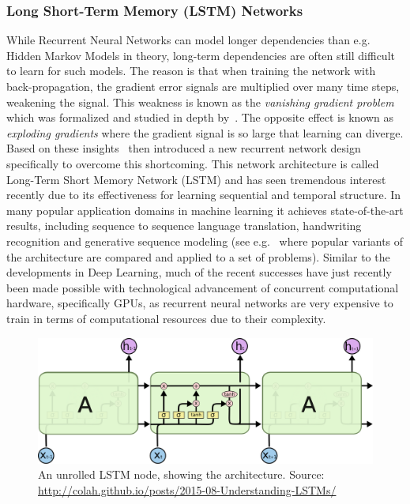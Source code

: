\subsubsection*{Long Short-Term Memory (LSTM) Networks}
\label{subs:Long Short-Term Memory (LSTM) Networks}


While Recurrent Neural Networks can model longer dependencies than e.g. Hidden Markov Models in theory, long-term dependencies are often still difficult to learn for such models. The reason is that when training the network with back-propagation, the gradient error signals are multiplied over many time steps, weakening the signal. This weakness is known as the \emph{vanishing gradient problem} which was formalized and studied in depth by~\cite{Hochreiter:1991aa}. The opposite effect is known as \emph{exploding gradients} where the gradient signal is so large that learning can diverge. Based on these insights~\cite{Hochreiter:1997aa} then introduced a new recurrent network design specifically to overcome this shortcoming.
This network architecture is called Long-Term Short Memory Network (LSTM) and has seen tremendous interest recently due to its effectiveness for learning sequential and temporal structure. In many popular application domains in machine learning it achieves state-of-the-art results, including sequence to sequence language translation, handwriting recognition and generative sequence modeling (see e.g.~\cite{Greff:2015aa} where popular variants of the architecture are compared and applied to a set of problems). Similar to the developments in \gls{Deep Learning}, much of the recent successes have just recently been made possible with technological advancement of concurrent computational hardware, specifically \glspl{GPU}, as recurrent neural networks are very expensive to train in terms of computational resources due to their complexity.

\begin{figure}[h]
  \centering
  \includegraphics[width=\textwidth]{img/LSTM3-chain.png}
  \caption{An unrolled LSTM node, showing the architecture. Source: \url{http://colah.github.io/posts/2015-08-Understanding-LSTMs/}}
  \label{fig:LSTM}
\end{figure}


